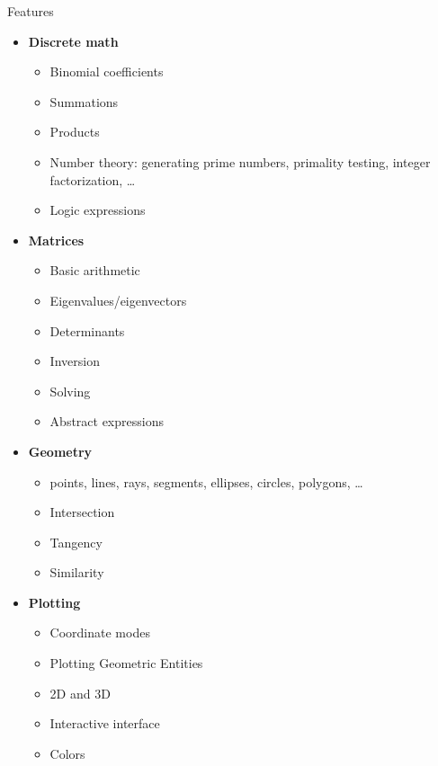\documentclass[xcolor=svgnames]{beamer}
\begin{document}
\begin{frame}{Features}
  \begin{multicols}{2}
    \begin{itemize}
      \tiny
    \item \textbf{Discrete math}
      \begin{itemize}
        \tiny
      \item Binomial coefficients
      \item Summations
      \item Products
      \item Number theory: generating prime numbers, primality testing, integer
        factorization, \ldots
      \item Logic expressions
      \end{itemize}

    \item \textbf{Matrices}
      \begin{itemize}
        \tiny
      \item Basic arithmetic
      \item Eigenvalues/eigenvectors
      \item Determinants
      \item Inversion
      \item Solving
      \item Abstract expressions
      \end{itemize}


    \item \textbf{Geometry}
      \begin{itemize}
        \tiny
      \item points, lines, rays, segments, ellipses, circles, polygons, \ldots
      \item Intersection
      \item Tangency
      \item Similarity
      \end{itemize}

    \item \textbf{Plotting}
      \begin{itemize}
        \tiny
      \item Coordinate modes
      \item Plotting Geometric Entities
      \item 2D and 3D
      \item Interactive interface
      \item Colors
      \end{itemize}


\end{itemize}
\end{multicols}
\end{frame}
\end{document}
